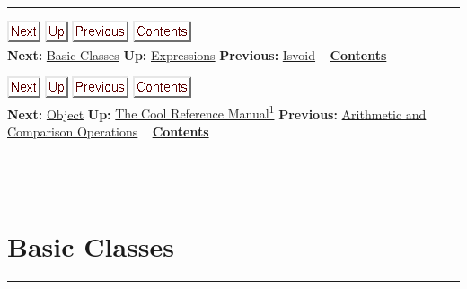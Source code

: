 \documentclass[]{article}
\begin{document}
\begin{center}\rule{3in}{0.4pt}\end{center}

\href{node26.html}{\includegraphics{next.png}}
\href{node13.html}{\includegraphics{up.png}}
\href{node24.html}{\includegraphics{prev.png}}
\href{node1.html}{\includegraphics{contents.png}} \\ \textbf{Next:}
\href{node26.html}{Basic Classes} \textbf{Up:}
\href{node13.html}{Expressions} \textbf{Previous:}
\href{node24.html}{Isvoid} ~ \textbf{\href{node1.html}{Contents}}

\href{node27.html}{\includegraphics{next.png}}
\href{cool-manual.html}{\includegraphics{up.png}}
\href{node25.html}{\includegraphics{prev.png}}
\href{node1.html}{\includegraphics{contents.png}} \\ \textbf{Next:}
\href{node27.html}{Object} \textbf{Up:} \href{cool-manual.html}{The Cool
Reference Manual\textsuperscript{1}} \textbf{Previous:}
\href{node25.html}{Arithmetic and Comparison Operations} ~
\textbf{\href{node1.html}{Contents}} \\ \\

\section{\\ Basic Classes}

\begin{center}\rule{3in}{0.4pt}\end{center}
\end{document}
